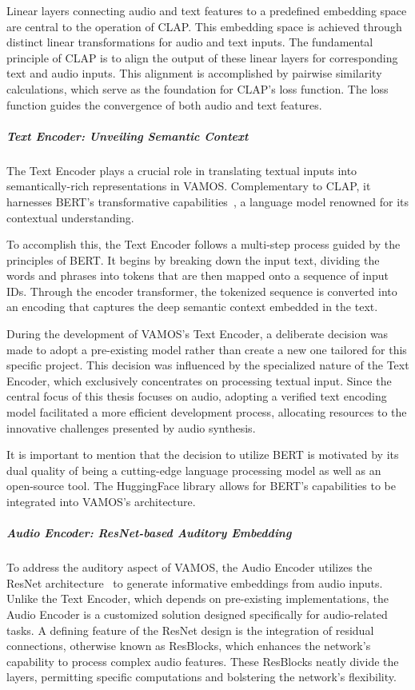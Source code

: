 Linear layers connecting audio and text features to a predefined embedding space are central to the operation of CLAP. This embedding space is achieved through distinct linear transformations for audio and text inputs. The fundamental principle of CLAP is to align the output of these linear layers for corresponding text and audio inputs. This alignment is accomplished by pairwise similarity calculations, which serve as the foundation for CLAP's loss function. The loss function guides the convergence of both audio and text features.

\subparagraph{Text Encoder: Unveiling Semantic Context}

The Text Encoder plays a crucial role in translating textual inputs into semantically-rich representations in VAMOS. Complementary to CLAP, it harnesses BERT's transformative capabilities~\cite{devlin_bert_2018}, a language model renowned for its contextual understanding.

To accomplish this, the Text Encoder follows a multi-step process guided by the principles of BERT. It begins by breaking down the input text, dividing the words and phrases into tokens that are then mapped onto a sequence of input IDs. Through the encoder transformer, the tokenized sequence is converted into an encoding that captures the deep semantic context embedded in the text.

During the development of VAMOS's Text Encoder, a deliberate decision was made to adopt a pre-existing model rather than create a new one tailored for this specific project. This decision was influenced by the specialized nature of the Text Encoder, which exclusively concentrates on processing textual input. Since the central focus of this thesis focuses on audio, adopting a verified text encoding model facilitated a more efficient development process, allocating resources to the innovative challenges presented by audio synthesis.

It is important to mention that the decision to utilize BERT is motivated by its dual quality of being a cutting-edge language processing model as well as an open-source tool. The HuggingFace library allows for BERT's capabilities to be integrated into VAMOS's architecture.

\subparagraph{Audio Encoder: ResNet-based Auditory Embedding}

To address the auditory aspect of VAMOS, the Audio Encoder utilizes the ResNet architecture~\cite{he_deep_2015} to generate informative embeddings from audio inputs. Unlike the Text Encoder, which depends on pre-existing implementations, the Audio Encoder is a customized solution designed specifically for audio-related tasks. A defining feature of the ResNet design is the integration of residual connections, otherwise known as ResBlocks, which enhances the network's capability to process complex audio features. These ResBlocks neatly divide the layers, permitting specific computations and bolstering the network's flexibility.

